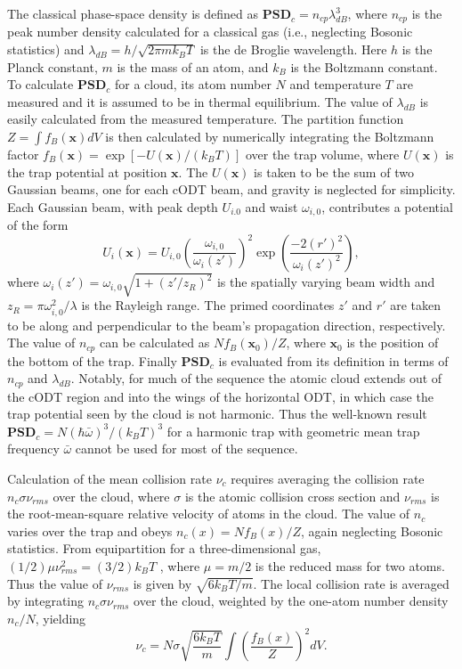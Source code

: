 \documentclass{article}
\begin{document}
The classical phase-space density is defined as $\mathbf{PSD}_c = n_{cp}\lambda^3_{dB}$, where $n_{cp}$ is the peak number density calculated for a classical gas (i.e., neglecting Bosonic statistics) and $\lambda_{dB} = h/ \sqrt{2\pi m k_B T}$ is the de Broglie wavelength. Here $h$ is the Planck constant, $m$ is the mass of an atom, and $k_B$ is the Boltzmann constant. To calculate $\mathbf{PSD}_c$ for a cloud, its atom number $N$ and temperature $T$ are measured and it is assumed to be in thermal equilibrium. The value of $\lambda_{dB}$ is easily calculated from the measured temperature. The partition function $Z = \int f_B (\mathbf{x}) dV$ is then calculated by numerically integrating the Boltzmann factor $f_B(\mathbf{x}) = \exp[-U(\mathbf{x})/(k_BT )]$ over the trap volume, where $U(\mathbf{x})$ is the trap potential at position $\mathbf{x}$. The $U(\mathbf{x})$ is taken to be the sum of two Gaussian beams, one for each cODT beam, and gravity is neglected for simplicity. Each Gaussian beam, with peak depth $U_{i.0}$ and waist $\omega_{i,0}$, contributes a potential of the form
\begin{equation}
    U_i(\mathbf{x})=U_{i,0}\left(\frac{\omega_{i,0}}{\omega_i(z')}\right)^2 \exp \left(\frac{-2(r')^2}{\omega_i (z')^2}\right),
\end{equation}
where $\omega_i(z')=\omega_{i,0}\sqrt{1+(z'/z_R)^2}$ is the spatially varying beam width and $z_R = \pi \omega^2_{i,0}/\lambda$ is the Rayleigh range. The primed coordinates $z'$ and $r'$ are taken to be along and perpendicular to the beam’s propagation direction, respectively. The value of $n_{cp}$ can be calculated as $N f_B(\mathbf{x}_0)/Z$, where $\mathbf{x}_0$ is the position of the bottom of the trap. Finally $\mathbf{PSD}_c$ is evaluated from its definition in terms of $n_{cp}$ and $\lambda_{dB}$. Notably, for much of the sequence the atomic cloud extends out of the cODT region and into the wings of the horizontal ODT, in which case the trap potential seen by the cloud is not harmonic. Thus the well-known result $\mathbf{PSD}_c = N (\hbar \bar{\omega})^3 / (k_B T)^3$ for a harmonic trap with geometric mean trap frequency $\bar{\omega}$ cannot be used for most of the sequence.

Calculation of the mean collision rate $\nu_c$ requires averaging the collision rate $n_c \sigma \nu_{rms}$ over the cloud, where $\sigma$ is the atomic collision cross section and $\nu_{rms}$ is the root-mean-square relative velocity of atoms in the cloud. The value of $n_c$ varies over the trap and obeys $n_c(x) = N f_B(x)/Z$, again neglecting Bosonic statistics. From equipartition for a three-dimensional gas, $(1/2)\mu \nu^2_{rms} = (3/2)k_B T$ , where $\mu = m/2$ is the reduced mass for two atoms. Thus the value of $\nu_{rms}$ is given by $\sqrt{6 k_B T/m}$. The local collision rate is averaged by integrating $n_c \sigma \nu_{rms}$ over the cloud, weighted by the one-atom number density $n_c/N$, yielding
\begin{equation}
    \nu_c = N \sigma \sqrt{\frac{6 k_B T}{m}} \int\left(\frac{f_B (x)}{Z}\right)^2 dV.
\end{equation}
\end{document}
